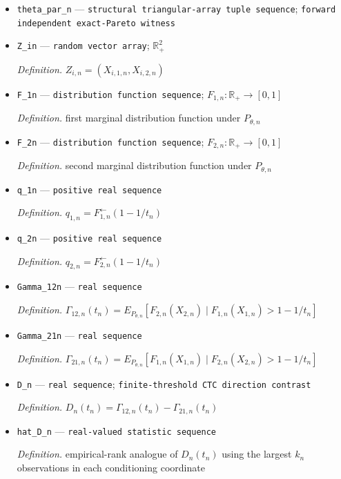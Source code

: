 \documentclass{article}
\begin{document}
\begin{itemize}
  \item \texttt{theta\_\allowbreak{}par\_\allowbreak{}n} --- \texttt{structural triangular-\allowbreak{}array tuple sequence}; \texttt{forward independent exact-\allowbreak{}Pareto witness}
  \item \texttt{Z\_\allowbreak{}in} --- \texttt{random vector array}; \(\mathbb R_+^2\)
  \par\smallskip\noindent\emph{Definition.} \(Z_{i,n}=(X_{i,1,n},X_{i,2,n})\)
  \item \texttt{F\_\allowbreak{}1n} --- \texttt{distribution function sequence}; \(F_{1,n}:\mathbb R_+\to[0,1]\)
  \par\smallskip\noindent\emph{Definition.} first marginal distribution function under \(P_{\theta,n}\)
  \item \texttt{F\_\allowbreak{}2n} --- \texttt{distribution function sequence}; \(F_{2,n}:\mathbb R_+\to[0,1]\)
  \par\smallskip\noindent\emph{Definition.} second marginal distribution function under \(P_{\theta,n}\)
  \item \texttt{q\_\allowbreak{}1n} --- \texttt{positive real sequence}
  \par\smallskip\noindent\emph{Definition.} \(q_{1,n}=F_{1,n}^{\leftarrow}(1-1/t_n)\)
  \item \texttt{q\_\allowbreak{}2n} --- \texttt{positive real sequence}
  \par\smallskip\noindent\emph{Definition.} \(q_{2,n}=F_{2,n}^{\leftarrow}(1-1/t_n)\)
  \item \texttt{Gamma\_\allowbreak{}12n} --- \texttt{real sequence}
  \par\smallskip\noindent\emph{Definition.} \(\Gamma_{12,n}(t_n)=E_{P_{\theta,n}}[F_{2,n}(X_{2,n})\mid F_{1,n}(X_{1,n})>1-1/t_n]\)
  \item \texttt{Gamma\_\allowbreak{}21n} --- \texttt{real sequence}
  \par\smallskip\noindent\emph{Definition.} \(\Gamma_{21,n}(t_n)=E_{P_{\theta,n}}[F_{1,n}(X_{1,n})\mid F_{2,n}(X_{2,n})>1-1/t_n]\)
  \item \texttt{D\_\allowbreak{}n} --- \texttt{real sequence}; \texttt{finite-\allowbreak{}threshold CTC direction contrast}
  \par\smallskip\noindent\emph{Definition.} \(D_n(t_n)=\Gamma_{12,n}(t_n)-\Gamma_{21,n}(t_n)\)
  \item \texttt{hat\_\allowbreak{}D\_\allowbreak{}n} --- \texttt{real-\allowbreak{}valued statistic sequence}
  \par\smallskip\noindent\emph{Definition.} empirical-rank analogue of \(D_n(t_n)\) using the largest \(k_n\) observations in each conditioning coordinate

\end{itemize}
\end{document}
